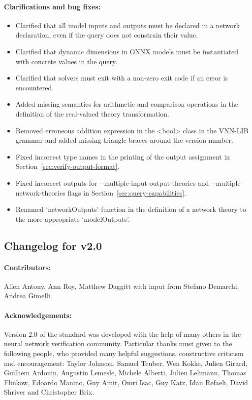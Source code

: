 \paragraph{Clarifications and bug fixes:}
\begin{itemize}
\item Clarified that all model inputs and outputs must be declared in a network declaration, even if the query does not constrain their value.
\item Clarified that dynamic dimensions in ONNX models must be instantiated with concrete values in the \vnnlib{} query.
\item Clarified that solvers must exit with a non-zero exit code if an error is encountered.
\item Added missing semantics for arithmetic and comparison operations in the definition of the real-valued theory transformation.
\item Removed erroneous addition expression in the <bool> class in the VNN-LIB grammar and added missing triangle braces around the version number.
\item Fixed incorrect type names in the printing of the output assignment in Section~\ref{sec:verify-output-format}.
\item Fixed incorrect outputs for {-}-multiple-input-output-theories and {-}-multiple-network-theories flags in Section~\ref{sec:query-capabilities}.
\item Renamed `networkOutputs' function in the definition of a network theory to the more appropriate `modelOutputs'.
\end{itemize}

\subsection*{Changelog for v2.0}

\paragraph{Contributors:} Allen Antony, Ann Roy, Matthew Daggitt with input from Stefano Demarchi, Andrea Gimelli.

\noindent \paragraph{Acknowledgements:} Version 2.0 of the standard was developed with the help of many others in the neural network verification community.
Particular thanks must given to the following people, who provided many helpful suggestions, constructive criticism and encouragement: Taylor Johnson, Samuel Teuber, Wen Kokke, Julien Girard, Guilhem Ardouin, Augustin Lemesle, Michele Alberti, Julien Lehmann, Thomas Flinkow, Edoardo Manino, Guy Amir, Omri Isac, Guy Katz, Idan Refaeli, David Shriver and Christopher Brix.

